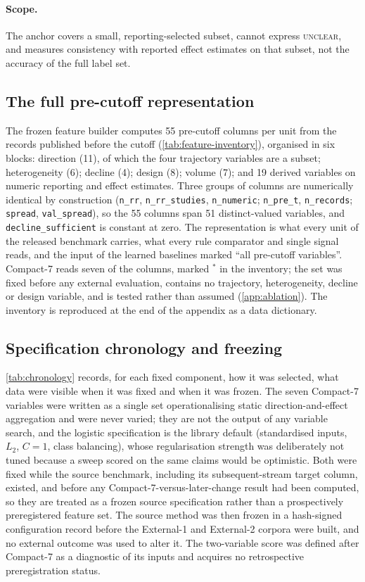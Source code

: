 \documentclass[11pt]{article}
\newcommand{\compact}{Compact-7\xspace}
\begin{document}
\paragraph{Scope.} The anchor covers a small, reporting-selected subset, cannot express
\textsc{unclear}, and measures consistency with reported effect estimates on that subset, not the
accuracy of the full label set.

\subsection{The full pre-cutoff representation}
\label{app:features}
The frozen feature builder computes 55 pre-cutoff columns per unit from the records published
before the cutoff (\cref{tab:feature-inventory}), organised in six blocks: direction (11), of
which the four trajectory variables are a subset; heterogeneity (6); decline (4); design (8);
volume (7); and 19 derived variables on numeric reporting and effect estimates. Three groups of
columns are numerically identical by construction (\texttt{n\_rr}, \texttt{n\_rr\_studies},
\texttt{n\_numeric}; \texttt{n\_pre\_t}, \texttt{n\_records}; \texttt{spread}, \texttt{val\_spread}),
so the 55 columns span 51 distinct-valued variables, and \texttt{decline\_sufficient} is constant at
zero. The representation is what every unit of the released benchmark carries, what every rule
comparator and single signal reads, and the input of the learned baselines marked ``all pre-cutoff
variables''. \compact reads
seven of the columns, marked $^{\ast}$ in the inventory; the set was fixed before any external
evaluation, contains no trajectory, heterogeneity, decline or design variable, and is tested rather
than assumed (\cref{app:ablation}). The inventory is reproduced at the end of the appendix
as a data dictionary.

\subsection{Specification chronology and freezing}
\label{app:chronology}
\cref{tab:chronology} records, for each fixed component, how it was selected, what data were
visible when it was fixed and when it was frozen. The seven \compact variables were written as a
single set operationalising static direction-and-effect aggregation and were never varied; they are
not the output of any variable search, and the logistic specification is the library default
(standardised inputs, $L_2$, $C=1$, class balancing), whose regularisation strength was deliberately
not tuned because a sweep scored on the same claims would be optimistic. Both were fixed while the
source benchmark, including its subsequent-stream target column, existed, and before any
\compact-versus-later-change result had been computed, so they are treated as a frozen source
specification rather than a prospectively preregistered feature set. The source method was then
frozen in a hash-signed configuration record before the External-1 and External-2 corpora were
built, and no external outcome was used to alter it. The two-variable score was defined after
\compact as a diagnostic of its inputs and acquires no retrospective preregistration status.
\end{document}
